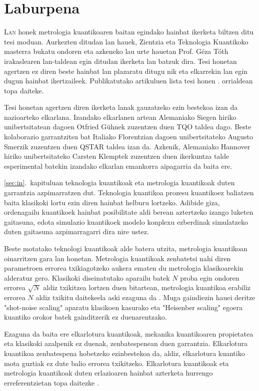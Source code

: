 \section*{Laburpena}
\label{sec:la}

\lettrine[lines=2, findent=3pt,nindent=0pt]{L}{an} honek metrologia kuantikoaren baitan egindako hainbat ikerketa biltzen ditu tesi moduan.
Aurkezten ditudan lan hauek, Zientzia eta Teknologia Kuantikoko masterra bukatu ondoren eta azkeneko lau urte hauetan Prof. Géza Tóth irakaslearen lan-taldean egin ditudan ikerketa lan batzuk dira.
Tesi honetan agertzen ez diren beste hainbat lan plazaratu ditugu nik eta elkarrekin lan egin dugun hainbat ikertzaileek.
Publikatutako artikuluen lista tesi honen \pageref{sec:pu}. orrialdean topa daiteke.

Tesi honetan agertzen diren ikerketa lanak gauzatzeko ezin bestekoa izan da nazioarteko elkarlana.
Izandako elkarlanen artean Alemaniako Siegen hiriko unibertsitatean dagoen Otfried Gühnek zuzentzen duen TQO taldea dago.
Beste kolaborazio garrantzitsu bat Italiako Florentzian dagoen unibertsitateko Augusto Smerzik zuzentzen duen QSTAR taldea izan da.
Azkenik, Alemaniako Hannover hiriko unibertsitateko Carsten Klemptek zuzentzen duen ikerkuntza talde esperimental batekin izandako elkarlan emankorra aipagarria da baita ere.

\ref{sec:in}.~kapituluan teknologia kuantikoak eta metrologia kuantikoak duten garrantzia azpimarratzen dut.
Teknologia kuantikoa prozesu kuantikoez baliatzen baita klasikoki lortu ezin diren hainbat helburu lortzeko.
Adibide giza, ordenagailu kuantikoek hainbat posibilitate aldi berean aztertzeko izango luketen gaitasuna, edota simulazio kuantikoek modelo konplexu ezberdinak simulatzeko duten gaitasuna azpimarragarri dira nire ustez.

Beste motatako teknologi kuantikoak alde batera utzita, metrologia kuantikoan oinarritzen gara lan honetan.
Metrologia kuantikoak zenbatetsi nahi diren parametroen errorea txikiagotzeko aukera ematen du metrologia klasikoarekin alderatuz gero.
Klasikoki diseinatutako aparailu batek $N$ proba egin ondoren errorea $\sqrt{N}$ aldiz txikitzea lortzen duen bitartean, metrologia kuantikoa erabiliz errorea $N$ aldiz txikitu daitekeela aski ezaguna da \cite{Giovannetti2004, Paris2009}.
Muga gaindiezin hauei deritze "shot-noise scaling" aparatu klasikoen kasurako eta "Heisenber scaling" egoera kuantiko orokor batek gainditzerik ez duenarentzako.

Ezaguna da baita ere elkarlotura kuantikoak, mekanika kuantikoaren propietatea eta klasikoki azalpenik ez duenak, zenbatespenean duen garrantzia.
Elkarlotura kuantikoa zenbatespena hobetzeko ezinbestekoa da, aldiz, elkarlotura kuantiko mota guztiak ez dute balio errorea txikitzeko.
Elkarlotura kuantikoak eta metrologia kuantikoak duten erlazioaren hainbat azterketa hurrengo erreferentzietan topa daitezke \cite{Pezze2009, Louchet-Chauvet2010, Appel2009, Riedel2010, Gross2010, Luecke2011, Strobel2014, Hyllus2010}.

